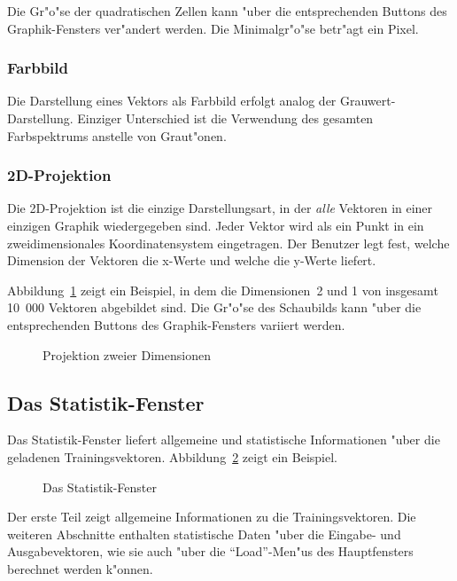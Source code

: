 Die Gr"o"se der quadratischen Zellen kann "uber die entsprechenden Buttons
des Graphik-Fensters ver"andert werden.
Die Minimalgr"o"se betr"agt ein Pixel. 

\subsubsection*{Farbbild}

Die Darstellung eines Vektors als Farbbild erfolgt analog der
Grauwert-Darstellung.
Einziger Unterschied ist die Verwendung des gesamten Farbspektrums
anstelle von Graut"onen.

\subsubsection*{2D-Projektion}

Die 2D-Projektion ist die einzige Darstellungsart, in der
{\it alle} Vektoren in einer einzigen Graphik wiedergegeben sind.
Jeder Vektor wird als ein Punkt in ein zweidimensionales Koordinatensystem
eingetragen.
Der Benutzer legt fest, welche Dimension der Vektoren die x-Werte und
welche die y-Werte liefert.

Abbildung~\ref{proj2D} zeigt ein Beispiel, in dem die Dimensionen~2 und 1
von insgesamt 10~000 Vektoren abgebildet sind.
Die Gr"o"se des Schaubilds kann "uber die entsprechenden Buttons des 
Graphik-Fensters variiert werden.

\begin{figure}[ht]
\centerline{}
\caption{\label{proj2D} Projektion zweier Dimensionen}
\end{figure}
 
\subsection{Das Statistik-Fenster}

Das Statistik-Fenster liefert allgemeine und statistische Informationen
"uber die geladenen Trainingsvektoren.
Abbildung~\ref{statistics} zeigt ein Beispiel.

\begin{figure}[ht]
\centerline{}
\caption{\label{statistics} Das Statistik-Fenster}
\end{figure}

Der erste Teil zeigt allgemeine Informationen zu die Trainingsvektoren.
Die weiteren Abschnitte enthalten statistische Daten "uber 
die Eingabe- und Ausgabevektoren, wie sie auch "uber die "`Load"'-Men"us
des Hauptfensters berechnet werden k"onnen.  

